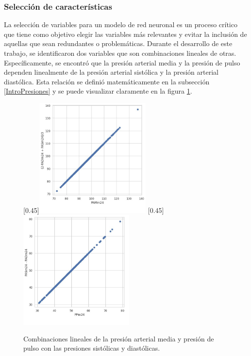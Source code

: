 \subsubsection{Selección de características}

La selección de variables para un modelo de red neuronal es un proceso crítico que tiene como objetivo 
elegir las variables más relevantes y evitar la inclusión de aquellas que sean redundantes o 
problemáticas. Durante el desarrollo de este trabajo, se identificaron dos variables que son 
combinaciones lineales de otras. Específicamente, se encontró que la presión arterial media y 
la presión de pulso dependen linealmente de la presión arterial sistólica y la presión arterial 
diastólica. Esta relación se definió matemáticamente en la subsección \ref{IntroPresiones} y 
se puede visualizar claramente en la figura \ref{fig:pamypp}. 

\begin{figure}[h!]
	\centering
	\hspace{1em}
	[0.45\linewidth]{\includegraphics[height=6cm]{./Figures/PAM.jpg}}
	\hspace{1em}
	[0.45\linewidth]{\includegraphics[height=6cm]{./Figures/PP.jpg}}
	\caption{Combinaciones lineales de la presión arterial media y presión de pulso con las presiones sistólicas y diastólicas.}\label{fig:pamypp}
\end{figure}

